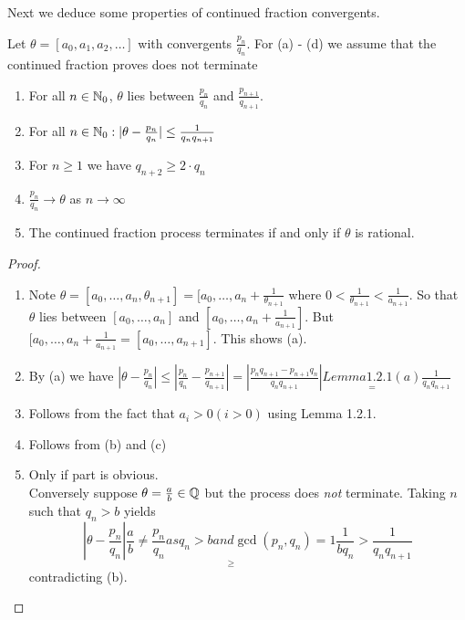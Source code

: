\documentclass[NumTh.tex]{subfiles}
\begin{document}
Next we deduce some properties of continued fraction convergents.

\begin{theorem}
  Let $\theta = [a_0,a_1,a_2,\dots ]$ with convergents $\frac{p_n}{q_n}$.
  For (a) - (d) we assume that the continued fraction proves does not terminate
  \begin{enumerate} %
    \item For all $n \in \mathbb{N}_0$, $\theta$ lies between $\frac{p_n}{q_n}$ and $\frac{p_{n+1}}{q_{n+1}}$.
    \item For all $n \in \mathbb{N}_0: |\theta - \frac{p_n}{q_n} | \leq \frac{1}{q_n q_{n+1}}$
    \item For $n \geq 1$ we have $q_{n+2} \geq 2\cdot q_n$
    \item $\frac{p_n}{q_n} \to \theta$ as $n \to \infty$
    \item The continued fraction process terminates if and only if $\theta$ is rational.
  \end{enumerate}
\end{theorem}

\begin{proof}
  \begin{enumerate}
    \item Note $\theta = [a_0,\dots,a_n,\theta_{n+1} ] = [a_0,\dots,a_n+\frac{1}{\theta_{n+1}}$
    where $0 < \frac{1}{\theta_{n+1}} < \frac{1}{a_{n+1}}$. So that $\theta$ lies between $[a_0,\dots,a_n]$ and $[a_0,\dots,a_n + \frac{1}{a_{n+1}} ]$.
    But $[a_0,\dots,a_n + \frac{1}{a_{n+1}} = [a_0,\dots,a_{n+1}]$. This shows (a).
    \item By (a) we have $|\theta - \frac{p_n}{q_n} | \leq |\frac{p_n}{q_n} - \frac{p_{n+1}}{q_{n+1}}| = | \frac{p_n q_{n+1} - p_{n+1} q_n}{q_n q_{n+1}} | \underset{=}{Lemma 1.2.1(a)} \frac{1}{q_n q_{n+1}}$
    \item Follows from the fact that $a_i >0 (i > 0 )$ using Lemma 1.2.1.
    \item Follows from (b) and (c)
    \item Only if part is obvious.\\
    Conversely suppose $\theta = \frac{a}{b} \in \mathbb{Q}$ but the process does \emph{not} terminate. Taking $n$ such that $q_n > b$ yields
    \[ | \theta - \frac{p_n}{q_n} | \underset{\geq}{\frac{a}{b} \neq \frac{p_n}{q_n} as q_n > b and \gcd(p_n,q_n) = 1} \frac{1}{b q_n} > \frac{1}{q_n q_{n+1}} \]
    contradicting (b).
  \end{enumerate}
\end{proof}
\end{document}
